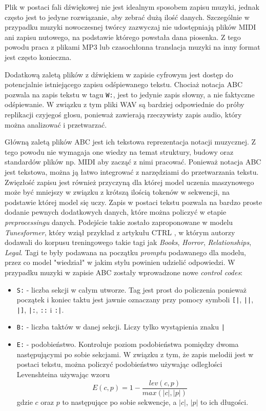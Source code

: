 \documentclass[data-science]{agh-wi} %
\begin{document}
Plik w postaci fali dźwiękowej nie jest idealnym sposobem zapisu muzyki, jednak często jest to jedyne rozwiązanie, aby zebrać dużą ilość danych. Szczególnie w przypadku muzyki nowoczesnej twórcy zazwyczaj nie udostępniają plików MIDI ani zapisu nutowego, na podstawie którego powstała dana piosenka. Z tego powodu praca z plikami MP3 lub czasochłonna translacja muzyki na inny format jest często konieczna.

Dodatkową zaletą plików z dźwiękiem w zapisie cyfrowym jest dostęp do potencjalnie istniejącego zapisu odśpiewanego tekstu. Chociaż notacja ABC pozwala na zapis tekstu w tagu \texttt{W:}, jest to jedynie zapis słowny, a nie faktyczne odśpiewanie. W związku z tym pliki WAV są bardziej odpowiednie do próby replikacji czyjegoś głosu, ponieważ zawierają rzeczywisty zapis audio, który można analizować i przetwarzać.

Główną zaletą plików ABC jest ich tekstowa reprezentacja notacji muzycznej. Z tego powodu nie wymagaja one wiedzy na temat struktury, budowy oraz standardów plików np. MIDI aby zacząć z nimi pracować. Ponieważ notacja ABC jest tekstowa, można ją łatwo integrować z narzędziami do przetwarzania tekstu. Zwięzłość zapisu jest również przyczyną dla której model uczenia maszynowego może być mniejszy w związku z krótszą ilością tokenów w sekwencji, na podstawie której model się uczy. Zapis w postaci tekstu pozwala na bardzo proste dodanie pewnych dodatkowych danych, które można policzyć w etapie \textit{preprocessingu} danych. Podejście takie zostało zaproponowane w modelu \textit{Tunesformer}\cite{tunesformer}, który wziął przykład z artykułu CTRL \cite{keskarCTRL2019}, w którym autorzy dodawali do korpusu treningowego takie tagi jak \textit{Books}, \textit{Horror}, \textit{Relationships}, \textit{Legal}. Tagi te były podawana na początku \textit{promptu} podawanego dla modelu, przez co model "wiedział" w jakim stylu powinien udzielić odpowiedzi. W przypadku muzyki w zapisie ABC zostały wprowadzone nowe \textit{control codes}:
\begin{itemize}
    \item \texttt{S:} - liczba sekcji w całym utworze. Tag jest prost do policzenia ponieważ początek i koniec taktu jest jawnie oznaczany przy pomocy symboli \texttt{[|}, \texttt{||}, \texttt{|]}, \texttt{|:}, \texttt{::} i \texttt{:|}.
    \item \texttt{B:} - liczba taktów w danej sekcji. Liczy tylko wystąpienia znaku \texttt{|}
    \item \texttt{E:} - podobieństwo. Kontroluje poziom podobieństwa pomiędzy dwoma następującymi po sobie sekcjami. W związku z tym, że zapis melodii jest w postaci tekstu, można policzyć podobieństwo używając odległości Levenshteina używając wzoru
          \begin{equation}
              E(c,p) = 1 - \dfrac{lev(c, p)}{max(|c|, |p|)}
          \end{equation}
          gdzie $c$ oraz $p$ to następujące po sobie sekwencje, a $|c|$, $|p|$ to ich długości.
\end{itemize}
\end{document}
